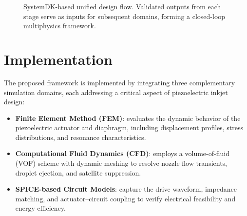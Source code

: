 \documentclass[conference]{IEEEtran}
\begin{document}
\begin{figure}[t]
\centering
{}
\caption{SystemDK-based unified design flow. 
Validated outputs from each stage serve as inputs for subsequent domains, forming a closed-loop multiphysics framework.}
\label{fig:flow}
\end{figure}

\section{Implementation}
The proposed framework is implemented by integrating three complementary simulation domains, each addressing a critical aspect of piezoelectric inkjet design:

\begin{itemize}
  \item \textbf{Finite Element Method (FEM)}: evaluates the dynamic behavior of the piezoelectric actuator and diaphragm, including displacement profiles, stress distributions, and resonance characteristics.
  \item \textbf{Computational Fluid Dynamics (CFD)}: employs a volume-of-fluid (VOF) scheme with dynamic meshing to resolve nozzle flow transients, droplet ejection, and satellite suppression.
  \item \textbf{SPICE-based Circuit Models}: capture the drive waveform, impedance matching, and actuator–circuit coupling to verify electrical feasibility and energy efficiency.
\end{itemize}
\end{document}
